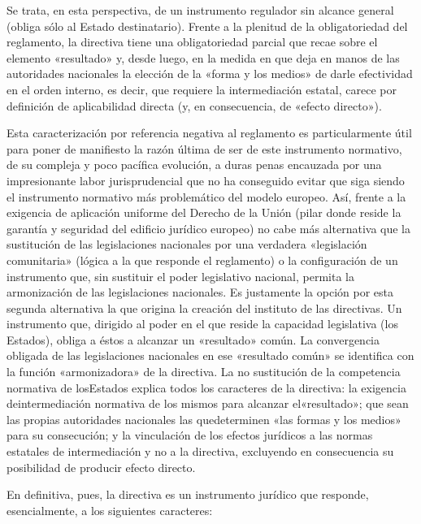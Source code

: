\documentclass[10pt,a4paper]{article}
\begin{document}
Se trata, en esta perspectiva, de un instrumento regulador sin alcance general (obliga sólo al Estado destinatario). Frente a la plenitud de la obligatoriedad del reglamento, la directiva tiene una obligatoriedad parcial que recae sobre el elemento «resultado» y, desde luego, en la medida en que deja en manos de las autoridades nacionales la elección de la «forma y los medios» de darle efectividad en el orden interno, es decir, que requiere la intermediación estatal, carece por definición de aplicabilidad directa (y, en consecuencia, de «efecto directo»).

Esta caracterización por referencia negativa al reglamento es particularmente útil para poner de manifiesto la razón última de ser de este instrumento normativo, de su compleja y poco pacífica evolución, a duras penas encauzada por una impresionante labor jurisprudencial que no ha conseguido evitar que siga siendo el instrumento normativo más problemático del modelo europeo. Así, frente a la exigencia de aplicación uniforme del Derecho de la Unión (pilar donde reside la garantía y seguridad del edificio jurídico europeo) no cabe más alternativa que la sustitución de las legislaciones nacionales por una verdadera «legislación comunitaria» (lógica a la que responde el reglamento) o la configuración de un instrumento que, sin sustituir el poder legislativo nacional, permita la armonización de las legislaciones nacionales. Es justamente la opción por esta segunda alternativa la que origina la creación del instituto de las directivas. Un instrumento que, dirigido al poder en el que reside la capacidad legislativa (los Estados), obliga a éstos a alcanzar un «resultado» común. La convergencia obligada de las legislaciones nacionales en ese «resultado común» se identifica con la función «armonizadora» de la directiva. La no sustitución de la competencia normativa de losEstados explica todos los caracteres de la directiva: la exigencia deintermediación normativa de los mismos para alcanzar el«resultado»; que sean las propias autoridades nacionales las quedeterminen «las formas y los medios» para su consecución; y la vinculación de los efectos jurídicos a las normas estatales de intermediación y no a la directiva, excluyendo en consecuencia su posibilidad de producir efecto directo.

En definitiva, pues, la directiva es un instrumento jurídico que responde, esencialmente, a los siguientes caracteres:
\end{document}
